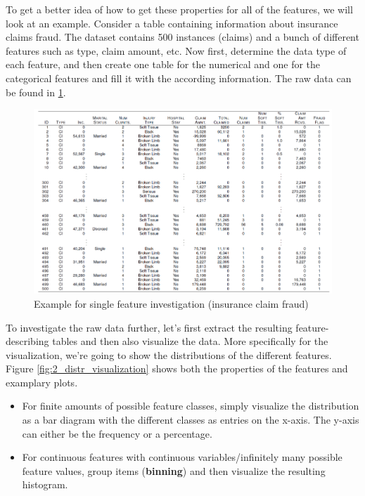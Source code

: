 \begin{note}
To get a better idea of how to get these properties for all of the features, we will look at an example. Consider a table containing information about insurance claims fraud. The dataset contains 500 instances (claims) and a bunch of different features such as type, claim amount, etc. Now first, determine the data type of each feature, and then create one table for the numerical and one for the categorical features and fill it with the according information. The raw data can be found in \ref{fig:2_single_feature_example}.

\begin{figure}[h]
  \centering
  \includegraphics[width=\textwidth]{assets/visualization_and_extraction/single_feature_example/raw_data.png}
  \caption{Example for single feature investigation (insurance claim fraud)}
  \label{fig:2_single_feature_example}
\end{figure}

To investigate the raw data further, let's first extract the resulting feature-describing tables and then also visualize the data. More specifically for the visualization, we're going to show the distributions of the different features. Figure \ref{fig:2_distr_visualization} shows both the properties of the features and examplary plots.\end{note}
\begin{itemize}
  \item For finite amounts of possible feature classes, simply visualize the distribution as a bar diagram with the different classes as entries on the x-axis. The y-axis can either be the frequency or a percentage.
  \item For continuous features with continuous variables/infinitely many possible feature values, group items (\textbf{binning}) and then visualize the resulting histogram.
\end{itemize}

